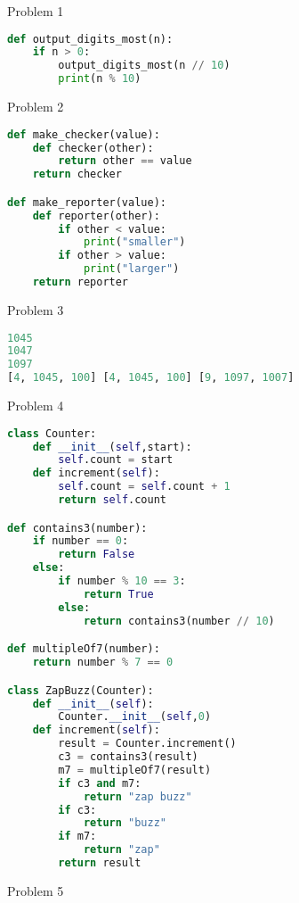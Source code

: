 \documentclass{article}
\begin{document}
Problem 1

\begin{lstlisting}[language=Python]
def output_digits_most(n):
    if n > 0:
        output_digits_most(n // 10)
        print(n % 10)
\end{lstlisting}

\bigskip
Problem 2

\begin{lstlisting}[language=Python]
def make_checker(value):
    def checker(other):
        return other == value
    return checker

def make_reporter(value):
    def reporter(other):
        if other < value:
            print("smaller")
        if other > value:
            print("larger")
    return reporter
\end{lstlisting}

\bigskip
Problem 3

\begin{lstlisting}[language=Python]
1045
1047
1097
[4, 1045, 100] [4, 1045, 100] [9, 1097, 1007]
\end{lstlisting}


\newpage
Problem 4

\begin{lstlisting}[language=Python]
class Counter:
    def __init__(self,start):
        self.count = start
    def increment(self):
        self.count = self.count + 1
        return self.count

def contains3(number):
    if number == 0:
        return False
    else:
        if number % 10 == 3:
            return True
        else:
            return contains3(number // 10)

def multipleOf7(number):
    return number % 7 == 0

class ZapBuzz(Counter):
    def __init__(self):
        Counter.__init__(self,0)
    def increment(self):
        result = Counter.increment()
        c3 = contains3(result)
        m7 = multipleOf7(result)
        if c3 and m7:
            return "zap buzz"
        if c3:
            return "buzz"
        if m7:
            return "zap"
        return result
\end{lstlisting}

\newpage
Problem 5
\end{document}
